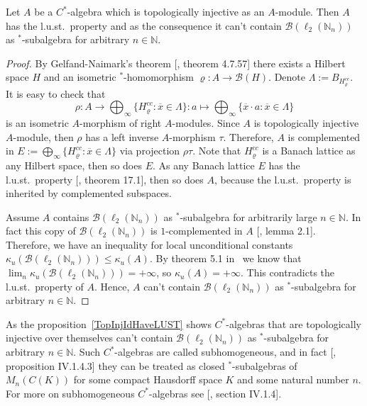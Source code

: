 \begin{proposition}\label{TopInjIdHaveLUST} Let $A$ be a $C^*$-algebra which is
topologically injective as an $A$-module. Then $A$ has the l.u.st.\ property and
as the consequence it can't contain  $\mathcal{B}(\ell_2(\mathbb{N}_n))$ as
${}^*$-subalgebra for arbitrary $n\in\mathbb{N}$.
\end{proposition}
\begin{proof} By Gelfand-Naimark's theorem [\cite{HelBanLocConvAlg}, theorem
4.7.57] there exists a Hilbert space $H$ and an isometric ${}^*$-homomorphism
$\varrho:A\to\mathcal{B}(H)$. Denote $\Lambda:=B_{H_\varrho^{cc}}$. It is easy
to check that 
$$
\rho
:A
    \to
\bigoplus\nolimits_\infty \{H_\varrho^{cc}:\overline{x}\in \Lambda \}
:a
    \mapsto 
\bigoplus\nolimits_\infty \{\overline{x}\cdot a:\overline{x}\in \Lambda \}
$$
is an isometric $A$-morphism of right $A$-modules. Since $A$ is topologically
injective $A$-module, then $\rho$ has a left inverse $A$-morphism $\tau$.
Therefore, $A$ is complemented in $E:=\bigoplus_\infty
\{H_\varrho^{cc}:\overline{x}\in \Lambda \}$ via projection $\rho\tau$. Note
that $H_{\varrho}^{cc}$ is a Banach lattice as any Hilbert space, then so does
$E$. As any Banach lattice $E$ has the l.u.st.\ property [\cite{DiestAbsSumOps},
theorem 17.1], then so does $A$, because the l.u.st.\ property is inherited by
complemented subspaces.

Assume $A$ contains $\mathcal{B}(\ell_2(\mathbb{N}_n))$ as ${}^*$-subalgebra for
arbitrarily large $n\in\mathbb{N}$. In fact this copy of
$\mathcal{B}(\ell_2(\mathbb{N}_n))$ is $1$-complemented in $A$
[\cite{LauLoyWillisAmnblOfBanAndCStarAlgsOfLCG}, lemma 2.1]. Therefore, we have
an inequality for local unconditional constants
$\kappa_u(\mathcal{B}(\ell_2(\mathbb{N}_n)))\leq \kappa_u(A)$. By theorem 5.1
in~\cite{GorLewAbsSmOpAndLocUncondStrct} we know that $\lim_n
\kappa_u(\mathcal{B}(\ell_2(\mathbb{N}_n)))=+\infty$, so $\kappa_u(A)=+\infty$.
This contradicts the l.u.st.\ property of $A$. Hence, $A$ can't contain
$\mathcal{B}(\ell_2(\mathbb{N}_n))$ as ${}^*$-subalgebra for arbitrary
$n\in\mathbb{N}$.
\end{proof}

As the proposition~\ref{TopInjIdHaveLUST} shows $C^*$-algebras that are
topologically injective over themselves can't contain
$\mathcal{B}(\ell_2(\mathbb{N}_n))$ as ${}^*$-subalgebra for arbitrary
$n\in\mathbb{N}$. Such $C^*$-algebras are called subhomogeneous, and in fact
[\cite{BlackadarOpAlg}, proposition IV.1.4.3] they can be treated as closed
${}^*$-subalgebras of $M_n(C(K))$ for some compact Hausdorff space $K$ and some
natural number $n$. For more on subhomogeneous $C^*$-algebras see
[\cite{BlackadarOpAlg}, section IV.1.4]. 

